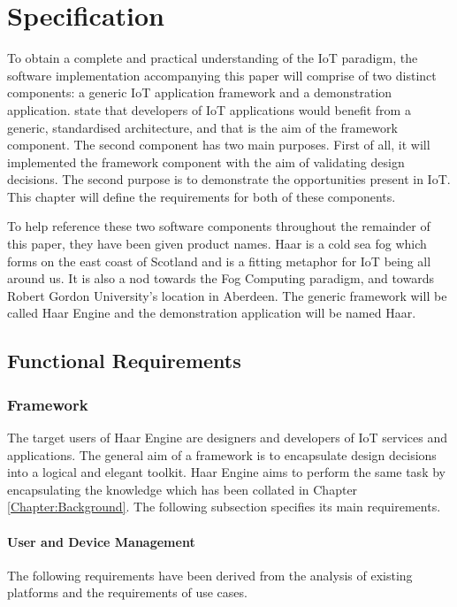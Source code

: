 \chapter{Specification}
\label{Chapter:Specification}
  To obtain a complete and practical understanding of the IoT paradigm, the software implementation accompanying this paper will comprise of two distinct components: a generic IoT application framework and a demonstration application. \citet{interoperability:2015} state that developers of IoT applications would benefit from a generic, standardised architecture, and that is the aim of the framework component. The second component has two main purposes. First of all, it will implemented the framework component with the aim of validating design decisions. The second purpose is to demonstrate the opportunities present in IoT. This chapter will define the requirements for both of these components.

  To help reference these two software components throughout the remainder of this paper, they have been given product names. Haar is a cold sea fog which forms on the east coast of Scotland and is a fitting metaphor for IoT being all around us. It is also a nod towards the Fog Computing paradigm, and towards Robert Gordon University's location in Aberdeen. The generic framework will be called Haar Engine and the demonstration application will be named Haar.

  \section{Functional Requirements}
    \subsection{Framework}
      The target users of Haar Engine are designers and developers of IoT services and applications. The general aim of a framework is to encapsulate design decisions into a logical and elegant toolkit. Haar Engine aims to perform the same task by encapsulating the knowledge which has been collated in Chapter \ref{Chapter:Background}. The following subsection specifies its main requirements.

      \subsubsection{User and Device Management}
        The following requirements have been derived from the analysis of existing platforms and the requirements of use cases.

